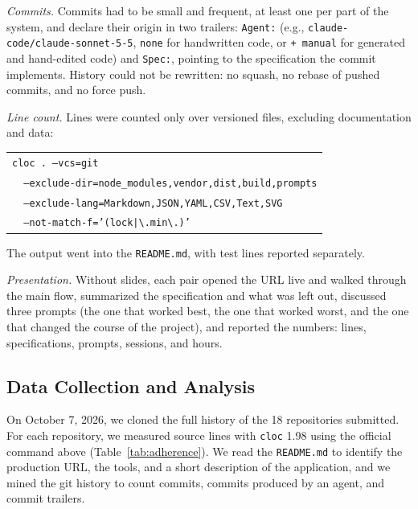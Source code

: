 \documentclass[conference]{IEEEtran}
\begin{document}
\emph{Commits.} Commits had to be small and frequent, at least one per part of the system, and declare their origin in two trailers: \texttt{Agent:} (e.g., \texttt{claude-code/claude-sonnet-5-5}, \texttt{none} for handwritten code, or \texttt{+~manual} for generated and hand-edited code) and \texttt{Spec:}, pointing to the specification the commit implements. History could not be rewritten: no squash, no rebase of pushed commits, and no force push.

\emph{Line count.} Lines were counted only over versioned files, excluding documentation and data:
\begin{center}
\footnotesize
\begin{tabular}{l}
\texttt{cloc . --vcs=git} \\
\texttt{\ \ --exclude-dir=node\_modules,vendor,dist,build,prompts} \\
\texttt{\ \ --exclude-lang=Markdown,JSON,YAML,CSV,Text,SVG} \\
\texttt{\ \ --not-match-f='(lock|\textbackslash.min\textbackslash.)'}
\end{tabular}
\end{center}
The output went into the \texttt{README.md}, with test lines reported separately.

\emph{Presentation.} Without slides, each pair opened the URL live and walked through the main flow, summarized the specification and what was left out, discussed three prompts (the one that worked best, the one that worked worst, and the one that changed the course of the project), and reported the numbers: lines, specifications, prompts, sessions, and hours.

\subsection{Data Collection and Analysis}

On October 7, 2026, we cloned the full history of the 18 repositories submitted. For each repository, we measured source lines with \texttt{cloc} 1.98 using the official command above (Table~\ref{tab:adherence}). We read the \texttt{README.md} to identify the production URL, the tools, and a short description of the application, and we mined the git history to count commits, commits produced by an agent, and commit trailers.
\end{document}
